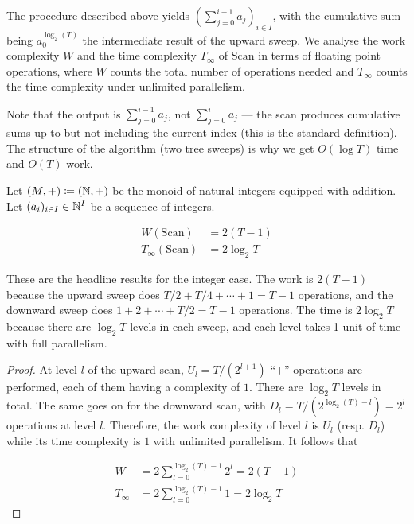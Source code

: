 The procedure described above yields $(\sum_{j=0}^{i-1}a_j)_{i\in I}$, with the cumulative sum being $a^{\log_2(T)}_{0}$ the intermediate result of the upward sweep. We analyse the work complexity $W$ and the time complexity $T_\infty$ of $\mathrm{Scan}$ in terms of floating point operations, where $W$ counts the total number of operations needed and $T_\infty$ counts the time complexity under unlimited parallelism.

\begin{ThomasAnnotation}
Note that the output is $\sum_{j=0}^{i-1}a_j$, not $\sum_{j=0}^{i}a_j$ — the scan produces cumulative sums up to but not including the current index (this is the standard definition). The structure of the algorithm (two tree sweeps) is why we get $O(\log T)$ time and $O(T)$ work.
\end{ThomasAnnotation}

\begin{proposition}
\label{prop:scan_integer_complexity}
    Let $(M, +) \coloneqq (\mathbb{N}, +)$ be the monoid of natural integers equipped with addition. Let $(a_i)_{i\in I}\in \mathbb{N}^I$ be a sequence of integers.

\begin{align}
    W(\mathrm{Scan})&= 2(T-1)\\
    T_\infty(\mathrm{Scan})&= 2\log_2 T
\end{align}
\end{proposition}

\begin{ThomasAnnotation}
These are the headline results for the integer case. The work is $2(T-1)$ because the upward sweep does $T/2 + T/4 + \cdots + 1 = T-1$ operations, and the downward sweep does $1 + 2 + \cdots + T/2 = T-1$ operations. The time is $2\log_2 T$ because there are $\log_2 T$ levels in each sweep, and each level takes 1 unit of time with full parallelism.
\end{ThomasAnnotation}

\begin{proof}
At level $l$ of the upward scan, $U_l = T/(2^{l+1})$ ``$+$'' operations are performed, each of them having a complexity of $1$. There are $\log_2 T$ levels in total. The same goes on for the downward scan, with $D_l = T/(2^{\log_2(T) - l})=2^{l}$ operations at level $l$. Therefore, the work complexity of level $l$ is $U_l$ (resp. $D_l$) while its time complexity is $1$ with unlimited parallelism. It follows that

\begin{align}
\label{eq:W_integer}
W &= 2\sum_{l=0}^{\log_2(T)-1}2^l=2(T-1)\\
\label{eq:T_integer}
T_\infty&= 2\sum_{l=0}^{\log_2(T)-1}1=2\log_2T
\end{align}
\end{proof}

